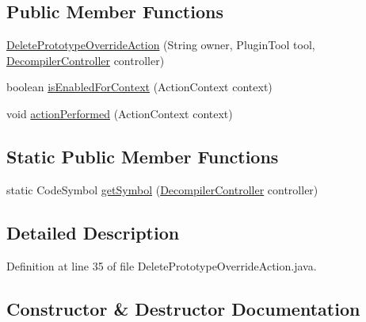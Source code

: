 \subsection*{Public Member Functions}
\begin{DoxyCompactItemize}
\item 
\mbox{\hyperlink{classghidra_1_1app_1_1plugin_1_1core_1_1decompile_1_1actions_1_1_delete_prototype_override_action_a311483c6b773b80b8395bc3cfeb03c1b}{Delete\+Prototype\+Override\+Action}} (String owner, Plugin\+Tool tool, \mbox{\hyperlink{classghidra_1_1app_1_1decompiler_1_1component_1_1_decompiler_controller}{Decompiler\+Controller}} controller)
\item 
boolean \mbox{\hyperlink{classghidra_1_1app_1_1plugin_1_1core_1_1decompile_1_1actions_1_1_delete_prototype_override_action_a1ded5df0bab8251adaf5d6e19e5adedb}{is\+Enabled\+For\+Context}} (Action\+Context context)
\item 
void \mbox{\hyperlink{classghidra_1_1app_1_1plugin_1_1core_1_1decompile_1_1actions_1_1_delete_prototype_override_action_a387e73291be3b42001b158151b4539a2}{action\+Performed}} (Action\+Context context)
\end{DoxyCompactItemize}
\subsection*{Static Public Member Functions}
\begin{DoxyCompactItemize}
\item 
static Code\+Symbol \mbox{\hyperlink{classghidra_1_1app_1_1plugin_1_1core_1_1decompile_1_1actions_1_1_delete_prototype_override_action_ada33281811697903f0a753abc6353937}{get\+Symbol}} (\mbox{\hyperlink{classghidra_1_1app_1_1decompiler_1_1component_1_1_decompiler_controller}{Decompiler\+Controller}} controller)
\end{DoxyCompactItemize}


\subsection{Detailed Description}


Definition at line 35 of file Delete\+Prototype\+Override\+Action.\+java.



\subsection{Constructor \& Destructor Documentation}
\mbox{\label{classghidra_1_1app_1_1plugin_1_1core_1_1decompile_1_1actions_1_1_delete_prototype_override_action_a311483c6b773b80b8395bc3cfeb03c1b}} 
